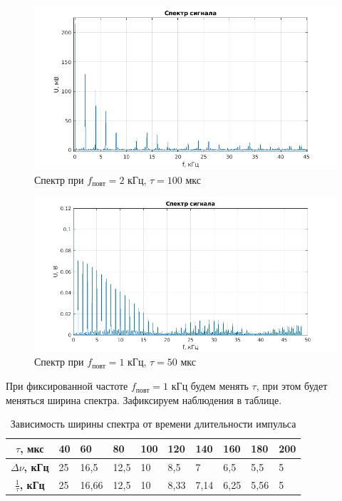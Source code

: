 \begin{figure}[h!]
    \centering
    \includegraphics[width = 14 cm]{images/1_100_2.png}
    \caption{Спектр при $f_{\text{повт}} = 2$ кГц, $\tau = 100$ мкс}
\end{figure}

\begin{figure}[h!]
    \centering
    \includegraphics[width = 14 cm]{images/1_50_1.png}
    \caption{Спектр при $f_{\text{повт}} = 1$ кГц, $\tau = 50$ мкс}
\end{figure}

При фиксированной частоте $f_{\text{повт}} = 1$ кГц будем менять $\tau$, при этом будет меняться ширина спектра. Зафиксируем наблюдения в таблице.

\begin{table}[]
    \centering
    \begin{tabular}{|c|l|l|l|l|l|l|l|l|l|}
        \hline
        \textbf{$\tau$, мкс}           & 40 & 60    & 80   & 100 & 120  & 140  & 160  & 180  & 200 \\ \hline
        \textbf{$\Delta \nu$, кГц}     & 25 & 16,5  & 12,5 & 10  & 8,5  & 7    & 6,5  & 5,5  & 5   \\ \hline
        \textbf{$\frac{1}{\tau}$, кГц} & 25 & 16,66 & 12,5 & 10  & 8,33 & 7,14 & 6,25 & 5,56 & 5   \\ \hline
    \end{tabular}
    \caption{Зависимость ширины спектра от времени длительности импульса}
\end{table}

